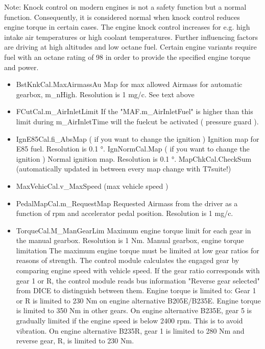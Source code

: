 \documentclass[11pt,a4paper]{book}
\begin{document}
Note: Knock control on modern engines is not a safety function but a normal
function. Consequently, it is considered normal when knock control reduces
engine torque in certain cases. The engine knock control increases for e.g. high
intake air temperatures or high coolant temperatures. Further influencing
factors are driving at high altitudes and low octane fuel. Certain engine
variants require fuel with an octane rating of \SI{98}{\RON} in order to provide the
specified engine torque and power.
\begin{itemize}
    \item
        BstKnkCal.MaxAirmassAu
        Map for max allowed Airmass for automatic gearbox, m\_nHigh. Resolution is 1 mg/c.
        See text above
    \item
        FCutCal.m\_AirInletLimit
        If the "MAF.m\_AirInletFuel" is higher than this limit during m\_AirInletTime will the fuelcut be activated
        ( pressure guard ).
    \item
        IgnE85Cal.fi\_AbsMap ( if you want to change the ignition )
        Ignition map for E85 fuel. Resolution is 0.1 °.
        IgnNormCal.Map ( if you want to change the ignition )
        Normal ignition map. Resolution is 0.1 °.
        MapChkCal.CheckSum (automatically updated in between every map change with T7suite!)
    \item
        MaxVehicCal.v\_MaxSpeed (max vehicle speed )
    \item
        PedalMapCal.m\_RequestMap
        Requested Airmass from the driver as a function of rpm and accelerator pedal position. Resolution is 1
        mg/c.
    \item
        TorqueCal.M\_ManGearLim
        Maximum engine torque limit for each gear in the manual gearbox. Resolution is 1 Nm.
        Manual gearbox, engine torque limitation
        The maximum engine torque must be limited at low gear ratios for reasons of strength.
        The control module calculates the engaged gear by comparing engine speed with vehicle speed.
        If the gear ratio corresponds with gear 1 or R, the control module reads bus information "Reverse
        gear selected" from DICE to distinguish between them.
        Engine torque is limited to:
        Gear 1 or R is limited to 230 Nm on engine alternative B205E/B235E. Engine torque is limited to 350
        Nm in other gears.
        On engine alternative B235E, gear 5 is gradually limited if the engine speed is below 2400 rpm. This is
        to avoid vibration.
        On engine alternative B235R, gear 1 is limited to 280 Nm and reverse gear, R, is limited to 230 Nm.

\end{itemize}
\end{document}
